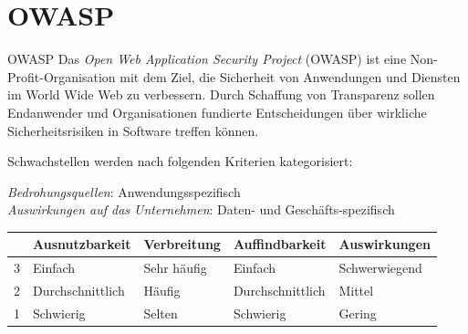 \section{OWASP}

\begin{defi}{OWASP}
    Das \emph{Open Web Application Security Project} (OWASP) ist eine Non-Profit-Organisation mit dem Ziel, die Sicherheit von Anwendungen und Diensten im World Wide Web zu verbessern.
    Durch Schaffung von Transparenz sollen Endanwender und Organisationen fundierte Entscheidungen über wirkliche Sicherheitsrisiken in Software treffen können.

    Schwachstellen werden nach folgenden Kriterien kategorisiert:

    \emph{Bedrohungsquellen}: Anwendungsspezifisch \\
    \emph{Auswirkungen auf das Unternehmen}: Daten- und Geschäfts-spezifisch

    \begin{tabularx}{\textwidth}{|l||X|X|X|X|}
        \hline
          & Ausnutzbarkeit   & Verbreitung & Auffindbarkeit   & Auswirkungen  \\\hline\hline
        3 & Einfach          & Sehr häufig & Einfach          & Schwerwiegend \\\hline
        2 & Durchschnittlich & Häufig      & Durchschnittlich & Mittel        \\\hline
        1 & Schwierig        & Selten      & Schwierig        & Gering        \\\hline
    \end{tabularx}
\end{defi}

